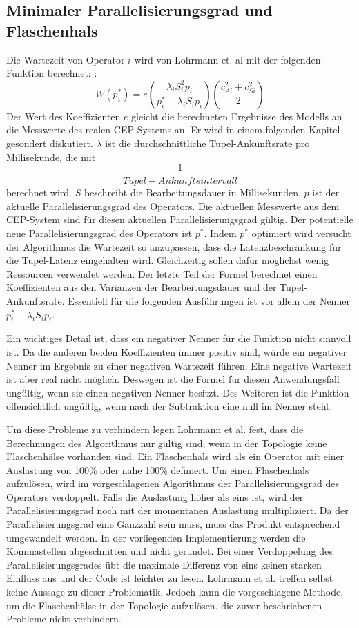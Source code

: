 \subsection{Minimaler Parallelisierungsgrad und Flaschenhals}
Die Wartezeit von Operator \(i\) wird von Lohrmann et. al mit der folgenden Funktion berechnet: \cite{lohrmann_elastic_2015}:
\[W(p_i^\ast) = e \left( \frac{\lambda_i {S}^{2}_{i} p_i}{p_i^\ast-\lambda_i {S}_i p_i}\right)\left(\frac{{c^{2}_{Ai}} + {c^{2}_{Si}}}{2}\right)\]
Der Wert des Koeffizienten \(e\) gleicht die berechneten Ergebnisse des Modells an die Messwerte des realen CEP-Systems an.
Er wird in einem folgenden Kapitel gesondert diskutiert.
\(\lambda\) ist die durchschnittliche Tupel-Ankunftsrate pro Millisekunde, die mit \[\frac{1}{Tupel-Ankunftsintervall}\] berechnet wird. 
\({S}\) beschreibt die Bearbeitungsdauer in Millisekunden.
\(p\) ist der aktuelle Parallelisierungsgrad des Operators.
Die aktuellen Messwerte aus dem CEP-System sind für diesen aktuellen Parallelisierungsgrad gültig.
Der potentielle neue Parallelisierungsgrad des Operators ist \(p^\ast\).
Indem \(p^\ast\) optimiert wird versucht der Algorithmus die Wartezeit so anzupassen, dass die Latenzbeschränkung für die Tupel-Latenz eingehalten wird.
Gleichzeitig sollen dafür möglichst wenig Ressourcen verwendet werden.
Der letzte Teil der Formel berechnet einen Koeffizienten aus den Varianzen der Bearbeitungsdauer und der Tupel-Ankunftsrate.
Essentiell für die folgenden Ausführungen ist vor allem der Nenner \(p_i^\ast-\lambda_i {S}_i p_i\).

Ein wichtiges Detail ist, dass ein negativer Nenner für die Funktion nicht sinnvoll ist.
Da die anderen beiden Koeffizienten immer positiv sind, würde ein negativer Nenner im Ergebnis zu einer negativen Wartezeit führen.
Eine negative Wartezeit ist aber real nicht möglich.
Deswegen ist die Formel für diesen Anwendungsfall ungültig, wenn sie einen negativen Nenner besitzt.
Des Weiteren ist die Funktion offensichtlich ungültig, wenn nach der Subtraktion eine null im Nenner  steht.

Um diese Probleme zu verhindern legen Lohrmann et al. fest, dass die Berechnungen des Algorithmus nur gültig sind, wenn in der Topologie keine Flaschenhälse vorhanden sind.
Ein Flaschenhals wird als ein Operator mit einer Auslastung von 100\% oder nahe 100\% definiert.
Um einen Flaschenhals aufzulösen, wird im vorgeschlagenen Algorithmus der Parallelisierungsgrad des Operators verdoppelt. Falls die Auslastung höher als eins ist, wird der Parallelisierungsgrad noch mit der momentanen Auslastung multipliziert. Da der Parallelisierungsgrad eine Ganzzahl sein muss, muss das Produkt entsprechend umgewandelt werden. In der vorliegenden Implementierung werden die Kommastellen abgeschnitten und nicht gerundet. Bei einer Verdoppelung des Parallelisierungsgrades übt die maximale Differenz von eins keinen starken Einfluss aus und der Code ist leichter zu lesen. Lohrmann et al. treffen selbst keine Aussage zu dieser Problematik.
Jedoch kann die vorgeschlagene Methode, um die Flaschenhälse in der Topologie aufzulösen, die zuvor beschriebenen Probleme nicht verhindern.


